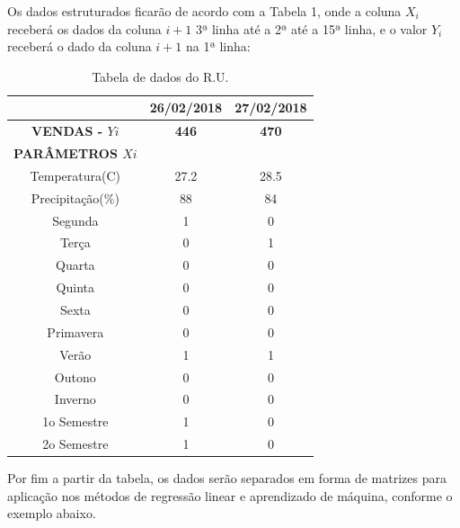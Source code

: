 \documentclass[	12pt, Times, openright, twoside, a4paper, english, brazil]{abntex2}
\begin{document}
            Os dados estruturados ficarão de acordo com a Tabela 1, onde a coluna $X_i$ receberá os dados da coluna $i+1$ 3ª linha até a 2ª até a 15ª linha, e o valor $Y_i$ receberá o dado da coluna $i+1$ na 1ª linha:
            \begin{table}[!ht]
          	\centering
          		\caption{Tabela de dados do R.U.}	\label{tab:regressaoMultipla}
                  
          				\begin{tabular}{|c|c|c|}
          			\hline \textbf{ }   &\textbf{26/02/2018} &\textbf{27/02/2018}\\
          			\hline \textbf{VENDAS - $Yi$}   &\textbf{446} &\textbf{470}\\
          			\hline \textbf{PARÂMETROS $Xi$}   &\textbf{ } &\textbf{ }\\
          			\hline Temperatura(C)      &27.2 	 			& 28.5\\
          			\hline Precipitação(\%)    & 88         		& 84\\

          			\hline Segunda             & 1          		& 0\\
          			\hline Terça               & 0          		& 1\\
          			\hline Quarta              & 0          		& 0\\
          			\hline Quinta              & 0          		& 0\\
          			\hline Sexta               & 0          		& 0\\

          			\hline Primavera           & 0          		& 0\\
          			\hline Verão               & 1          		& 1\\
          			\hline Outono              & 0          		& 0\\
          			\hline Inverno             & 0          		& 0\\

          			\hline 1o Semestre         & 1          		& 0\\
          			\hline 2o Semestre         & 1          		& 0\\
          		\end{tabular}
            \end{table}
            
            Por fim a partir da tabela, os dados serão separados em forma de matrizes para aplicação nos métodos de regressão linear e aprendizado de máquina, conforme o exemplo abaixo.
            
\end{document}
